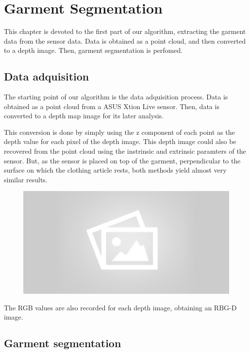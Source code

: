 \chapter{Garment Segmentation}
\label{garment_segmentation}
This chapter is devoted to the first part of our algorithm, extracting the garment data from the sensor data. Data is obtained as a point cloud, and then converted to a depth image. Then, garment segmentation is perfomed.

\section{Data adquisition}
\label{data_adquisition}

The starting point of our algorithm is the data adquisition process. Data is obtained as a point cloud from a ASUS Xtion Live sensor. Then, data is converted to a depth map image for its later analysis. 

This conversion is done by simply using the z component of each point as the depth value for each pixel of the depth image. This depth image could also be recovered from the point cloud using the instrinsic and extrinsic paramters of the sensor. But, as the sensor is placed on top of the garment, perpendicular to the surface on which the clothing article rests, both methods yield almost very similar results.

\begin{figure}[thpb]
    \centering
    \includegraphics[width=0.7
    \textwidth]{figures/placeholder2.png}
    \caption{}
    \label{fig:point_cloud_and_depth_image}
\end{figure}

The RGB values are also recorded for each depth image, obtaining an RBG-D image.

\section{Garment segmentation}
\label{garment_segmentation_mask}

